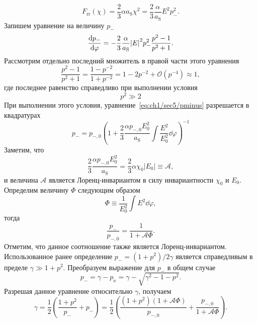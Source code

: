 \begin{equation}
    F_\mathrm{rr}(\chi) = \frac{2}{3} \alpha a_\mathrm{S} \chi^2 = \frac{2}{3} \frac{\alpha}{a_\mathrm{S}} E^2 p_-^2.
\end{equation}
Запишем уравнение на величину $p_-$
\begin{equation}
    \label{eq:ch1/sec5/pminus}
    \dv{p_-}{\varphi} = - \frac{2}{3}\frac{\alpha}{a_\mathrm{S}} {|E|}^2 p_-^2 \frac{p^2 - 1}{p^2 + 1}.
\end{equation}
Рассмотрим отдельно последний множитель в правой части этого уравнения
\begin{equation}
    \frac{p^2-1}{p^2+1} = \frac{1-p^{-2}}{1+p^{-2}} = 1 - 2 p^{-2} + \mathcal{O}(p^{-4}) \approx 1,
\end{equation}
где последнее равенство справедливо при выполнении условия
\begin{equation}
    \label{eq:ch1/sec5/p_condition}
    p^2 \gg 2
\end{equation}
При выполнении этого условия, уравнение~\eqref{eq:ch1/sec5/pminus} разрешается в квадратурах
\begin{equation}
    p_- = p_{-, 0}{\left( 1 + \frac{2}{3}\frac{\alpha p_{-, 0} E_0^2}{a_\mathrm{S}}\int{\frac{E^2}{E_0^2}\dd\varphi}  \right)}^{-1}
\end{equation}
Заметим, что
\begin{equation}
    \frac{2}{3}\frac{\alpha p_{-,0} E_0^2}{a_\mathrm{S}} = \frac{2}{3}\alpha \chi_0 |E_0| \equiv \mathcal{A},
\end{equation}
и величина $\mathcal{A}$ является Лоренц-инвариантом в силу инвариантности $\chi_0$ и $E_0$.
Определим величину $\Phi$ следующим образом
\begin{equation}
    \label{eq:ch1/sec5/Phi}
    \Phi \equiv \frac{1}{E_0^2}\int{E^2\dd\varphi},
\end{equation}
тогда 
\begin{equation}
    \label{eq:ch1/sec5/sol_pm}
    \frac{p_-}{p_{-, 0}} = \frac{1}{{1 + \mathcal{A}\Phi}}.
\end{equation}
Отметим, что данное соотношение также является Лоренц-инвариантом. 
Использованное ранее определение $p_- = (1 + p^2) / 2 \gamma$ является справедливым в пределе $\gamma \gg 1 + p^2$.
Преобразуем выражение для $p_-$ в общем случае
\begin{equation}
    p_- = \gamma - p_x = \gamma - \sqrt{\gamma^2 - 1 - p^2}.
\end{equation}
Разрешая данное уравнение относительно $\gamma$, получаем
\begin{equation}
    \label{eq:ch1/sec5/sol_gamma}
    \gamma = \frac{1}{2} \left( \frac{1+p^2}{p_-} + p_- \right) = \frac{1}{2} \left( \frac{(1+p^2)(1 + \mathcal{A}\Phi)}{p_{-,0}} + \frac{p_{-,0}}{1 + \mathcal{A}\Phi} \right).
\end{equation}
